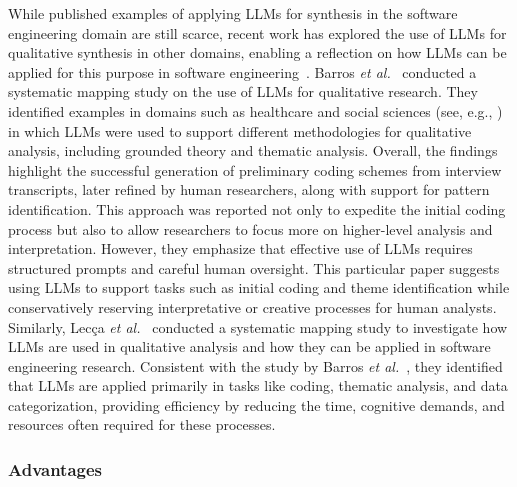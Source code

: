 While published examples of applying LLMs for synthesis in the software engineering domain are still scarce, recent work has explored the use of LLMs for qualitative synthesis in other domains, enabling a reflection on how LLMs can be applied for this purpose in software engineering~\cite{DBLP:journals/ase/BanoHZT24}. Barros \textit{et al.}~\cite{barros2024largelanguagemodelqualitative} conducted a systematic mapping study on the use of LLMs for qualitative research. They identified examples in domains such as healthcare and social sciences (see, e.g., \cite{de2024performing,mathis2024inductive}) in which LLMs were used to support different methodologies for qualitative analysis, including grounded theory and thematic analysis. Overall, the findings highlight the successful generation of preliminary coding schemes from interview transcripts, later refined by human researchers, along with support for pattern identification. This approach was reported not only to expedite the initial coding process but also to allow researchers to focus more on higher-level analysis and interpretation. However, they emphasize that effective use of LLMs requires structured prompts and careful human oversight. This particular paper suggests using LLMs to support tasks such as initial coding and theme identification while conservatively reserving interpretative or creative processes for human analysts.
Similarly, Lecça \textit{et al.}~\cite{leça2024applicationsimplicationslargelanguage} conducted a systematic mapping study to investigate how LLMs are used in qualitative analysis and how they can be applied in software engineering research. Consistent with the study by Barros \textit{et al.}~\cite{barros2024largelanguagemodelqualitative}, they identified that LLMs are applied primarily in tasks like coding, thematic analysis, and data categorization, providing efficiency by reducing the time, cognitive demands, and resources often required for these processes.

\subsubsection{Advantages}

